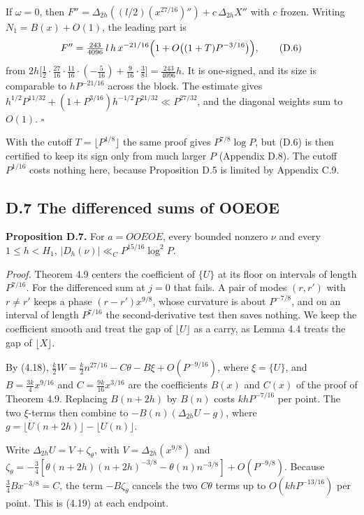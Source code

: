 \documentclass[11pt,a4paper]{article}
\begin{document}
If \(\omega=0\), then
\(F''=\Delta_{2h}((l/2)(x^{27/16})'')+c\,\Delta_{2h}X''\) with \(c\)
frozen. Writing \(N_1=B(x)+O(1)\), the leading part is \[
F''=\tfrac{243}{4096}\,l\,h\,x^{-21/16}
\Bigl(1+O\bigl((1+T)P^{-3/16}\bigr)\Bigr),
\tag{D.6}
\] from
\(2h\bigl[\tfrac12\cdot\tfrac{27}{16}\cdot\tfrac{11}{16}\cdot(-\tfrac5{16})
+\tfrac9{16}\cdot\tfrac38\bigr]=\tfrac{243}{4096}h\). It is one-signed,
and its size is comparable to \(hP^{-21/16}\) across the block. The
estimate gives \(h^{1/2}P^{11/32}+(1+P^{3/16})h^{-1/2}P^{21/32}\ll
P^{27/32}\), and the diagonal weights sum to \(O(1)\). \(\square\)

With the cutoff \(T=\lfloor P^{1/8}\rfloor\) the same proof gives
\(P^{7/8}\log P\), but (D.6) is then certified to keep its sign only
from much larger \(P\) (Appendix D.8). The cutoff \(P^{1/16}\) costs
nothing here, because Proposition D.5 is limited by Appendix C.9.


\subsection{D.7 The differenced sums of
OOEOE}\label{d.7-the-differenced-sums-of-ooeoe}

\textbf{Proposition D.7.} For \(a=OOEOE\), every bounded nonzero \(\nu\)
and every \(1\le h<H_1\), \(|D_h(\nu)|\ll_C P^{15/16}\log^2P\).

\emph{Proof.} Theorem 4.9 centers the coefficient of \(\{U\}\) at its
floor on intervals of length \(P^{7/16}\). For the differenced sum at
\(j=0\) that fails. A pair of modes \((r,r')\) with \(r\ne r'\) keeps a
phase \((r-r')x^{9/8}\), whose curvature is about \(P^{-7/8}\), and on
an interval of length \(P^{7/16}\) the second-derivative test then saves
nothing. We keep the coefficient smooth and treat the gap of
\(\lfloor U\rfloor\) as a carry, as Lemma 4.4 treats the gap of
\(\lfloor X\rfloor\).

By (4.18), \(\tfrac k2W=\tfrac k2n^{27/16}-C\theta-B\xi+O(P^{-9/16})\),
where \(\xi=\{U\}\), and \(B=\tfrac{3k}4x^{9/16}\) and
\(C=\tfrac{9k}{16}x^{3/16}\) are the coefficients \(B(x)\) and \(C(x)\)
of the proof of Theorem 4.9. Replacing \(B(n+2h)\) by \(B(n)\) costs
\(khP^{-7/16}\) per point. The two \(\xi\)-terms then combine to
\(-B(n)(\Delta_{2h}U-g)\), where
\(g=\lfloor U(n+2h)\rfloor-\lfloor U(n)\rfloor\).

Write \(\Delta_{2h}U=V+\zeta_\theta\), with \(V=\Delta_{2h}(x^{9/8})\)
and
\(\zeta_\theta=-\tfrac34[\theta(n+2h)(n+2h)^{-3/8}-\theta(n)n^{-3/8}]
+O(P^{-9/8})\). Because \(\tfrac34Bx^{-3/8}=C\), the term
\(-B\zeta_\theta\) cancels the two \(C\theta\) terms up to
\(O(khP^{-13/16})\) per point. This is (4.19) at each endpoint.
\end{document}
